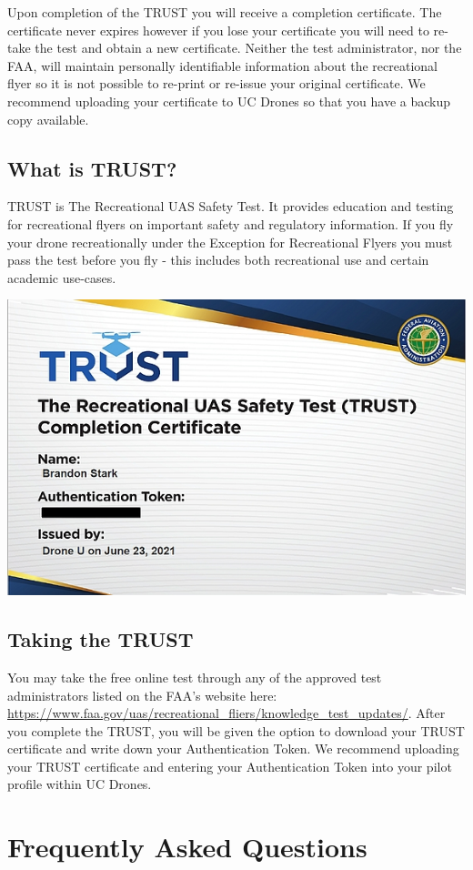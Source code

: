 \documentclass[
  12pt,
]{book}
\begin{document}
Upon completion of the TRUST you will receive a completion certificate. The certificate never expires however if you lose your certificate you will need to re-take the test and obtain a new certificate. Neither the test administrator, nor the FAA, will maintain personally identifiable information about the recreational flyer so it is not possible to re-print or re-issue your original certificate. We recommend uploading your certificate to UC Drones so that you have a backup copy available.

\subsection{What is TRUST?}\label{what-is-trust}

TRUST is The Recreational UAS Safety Test. It provides education and testing for recreational flyers on important safety and regulatory information. If you fly your drone recreationally under the Exception for Recreational Flyers you must pass the test before you fly - this includes both recreational use and certain academic use-cases.

\begin{center}\includegraphics[width=0.5\linewidth]{images/TRUST_cert} \end{center}

\subsection{Taking the TRUST}\label{taking-the-trust}

You may take the free online test through any of the approved test administrators listed on the FAA's website here: \url{https://www.faa.gov/uas/recreational_fliers/knowledge_test_updates/}. After you complete the TRUST, you will be given the option to download your TRUST certificate and write down your Authentication Token. We recommend uploading your TRUST certificate and entering your Authentication Token into your pilot profile within UC Drones.

\section{Frequently Asked Questions}\label{license-FAQ}
\end{document}
